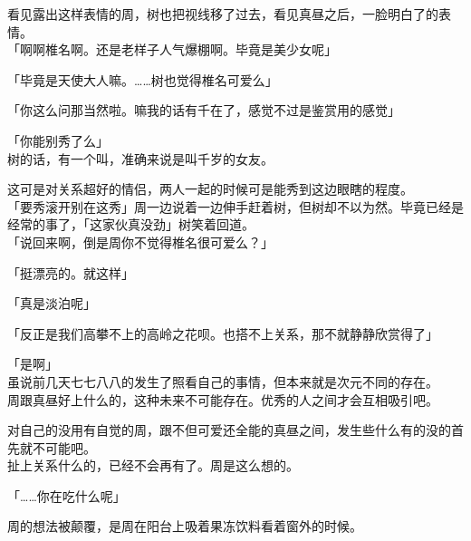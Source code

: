 看见露出这样表情的周，树也把视线移了过去，看见真昼之后，一脸明白了的表情。\\

「啊啊椎名啊。还是老样子人气爆棚啊。毕竟是美少女呢」

「毕竟是天使大人嘛。……树也觉得椎名可爱么」

「你这么问那当然啦。嘛我的话有千在了，感觉不过是鉴赏用的感觉」

「你能别秀了么」\\

树的话，有一个叫，准确来说是叫千岁的女友。

这可是对关系超好的情侣，两人一起的时候可是能秀到这边眼瞎的程度。\\

「要秀滚开别在这秀」周一边说着一边伸手赶着树，但树却不以为然。毕竟已经是经常的事了，「这家伙真没劲」树笑着回道。\\

「说回来啊，倒是周你不觉得椎名很可爱么？」

「挺漂亮的。就这样」

「真是淡泊呢」

「反正是我们高攀不上的高岭之花呗。也搭不上关系，那不就静静欣赏得了」

「是啊」\\

虽说前几天七七八八的发生了照看自己的事情，但本来就是次元不同的存在。\\

周跟真昼好上什么的，这种未来不可能存在。优秀的人之间才会互相吸引吧。

对自己的没用有自觉的周，跟不但可爱还全能的真昼之间，发生些什么有的没的首先就不可能吧。\\

扯上关系什么的，已经不会再有了。周是这么想的。\\

\vspace{2\baselineskip}

「……你在吃什么呢」

周的想法被颠覆，是周在阳台上吸着果冻饮料看着窗外的时候。
